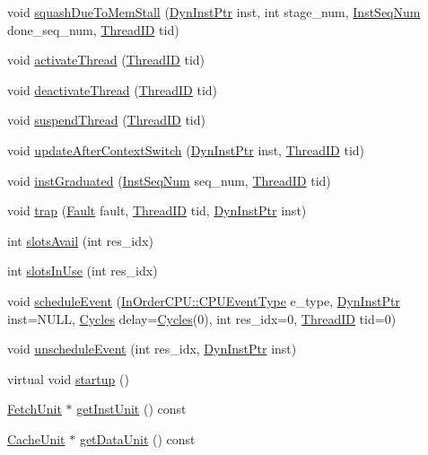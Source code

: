 \begin{DoxyCompactItemize}
\item 
void \hyperlink{classResourcePool_ae8f7628b42285a715d374b5a04f241e4}{squashDueToMemStall} (\hyperlink{classRefCountingPtr}{DynInstPtr} inst, int stage\_\-num, \hyperlink{inst__seq_8hh_a258d93d98edaedee089435c19ea2ea2e}{InstSeqNum} done\_\-seq\_\-num, \hyperlink{base_2types_8hh_ab39b1a4f9dad884694c7a74ed69e6a6b}{ThreadID} tid)
\item 
void \hyperlink{classResourcePool_a687aa4600423bb30ecf3bb1da6cd6000}{activateThread} (\hyperlink{base_2types_8hh_ab39b1a4f9dad884694c7a74ed69e6a6b}{ThreadID} tid)
\item 
void \hyperlink{classResourcePool_ad11d9216ad92d9036ebf37844cf6e706}{deactivateThread} (\hyperlink{base_2types_8hh_ab39b1a4f9dad884694c7a74ed69e6a6b}{ThreadID} tid)
\item 
void \hyperlink{classResourcePool_aee7a498a20266fbfbc6aa3f165577b68}{suspendThread} (\hyperlink{base_2types_8hh_ab39b1a4f9dad884694c7a74ed69e6a6b}{ThreadID} tid)
\item 
void \hyperlink{classResourcePool_a339073618ad3c21c492d64a55ce2e216}{updateAfterContextSwitch} (\hyperlink{classRefCountingPtr}{DynInstPtr} inst, \hyperlink{base_2types_8hh_ab39b1a4f9dad884694c7a74ed69e6a6b}{ThreadID} tid)
\item 
void \hyperlink{classResourcePool_a3f5f4da90448a4c3a3c0533881fb3129}{instGraduated} (\hyperlink{inst__seq_8hh_a258d93d98edaedee089435c19ea2ea2e}{InstSeqNum} seq\_\-num, \hyperlink{base_2types_8hh_ab39b1a4f9dad884694c7a74ed69e6a6b}{ThreadID} tid)
\item 
void \hyperlink{classResourcePool_abf76d6d245f7d3b17d26ea8dcc0cf36f}{trap} (\hyperlink{classRefCountingPtr}{Fault} fault, \hyperlink{base_2types_8hh_ab39b1a4f9dad884694c7a74ed69e6a6b}{ThreadID} tid, \hyperlink{classRefCountingPtr}{DynInstPtr} inst)
\item 
int \hyperlink{classResourcePool_acbd2796a939e932960eb09ec21ce3c3b}{slotsAvail} (int res\_\-idx)
\item 
int \hyperlink{classResourcePool_ac30878605317c199fc4371360bce7e0c}{slotsInUse} (int res\_\-idx)
\item 
void \hyperlink{classResourcePool_a2ab648fcabe96285d025deacd2175cbd}{scheduleEvent} (\hyperlink{classInOrderCPU_aedc081b7a3ef1b1568e62dec4a64c1ca}{InOrderCPU::CPUEventType} e\_\-type, \hyperlink{classRefCountingPtr}{DynInstPtr} inst=NULL, \hyperlink{classCycles}{Cycles} delay=\hyperlink{classCycles}{Cycles}(0), int res\_\-idx=0, \hyperlink{base_2types_8hh_ab39b1a4f9dad884694c7a74ed69e6a6b}{ThreadID} tid=0)
\item 
void \hyperlink{classResourcePool_a3102e3eb3a1648c4c448c0573142fd0b}{unscheduleEvent} (int res\_\-idx, \hyperlink{classRefCountingPtr}{DynInstPtr} inst)
\item 
virtual void \hyperlink{classResourcePool_a86b760932b88a9cebef1df8514818390}{startup} ()
\item 
\hyperlink{classFetchUnit}{FetchUnit} $\ast$ \hyperlink{classResourcePool_a6a12b19003afbeeb3b69b71ced3b2a6e}{getInstUnit} () const 
\item 
\hyperlink{classCacheUnit}{CacheUnit} $\ast$ \hyperlink{classResourcePool_ab2c545b49e59a8de568a4f7a6cbd7d32}{getDataUnit} () const 
\end{DoxyCompactItemize}
